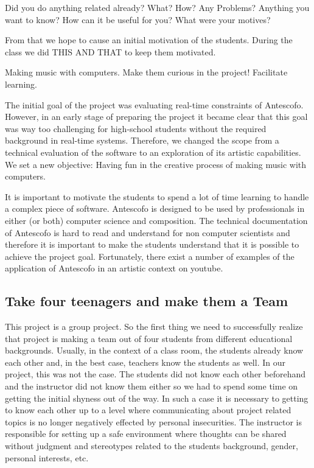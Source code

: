 \documentclass[onecolumn,nocopyrightspace,preprint]{sigplanconf}
\begin{document}
Did you do anything related already? What? How? Any Problems? Anything you want to know?
How can it be useful for you?
What were your motives?

From that we hope to cause an initial motivation of the students. During the class we did THIS AND THAT
to keep them motivated.


Making music with computers.
Make them curious in the project!
Facilitate learning.


The initial goal of the project was evaluating real-time constraints of
Antescofo. However, in an early stage of preparing the project it became clear
that this goal was way too challenging for high-school students without the
required background in real-time systems. Therefore, we changed the scope from
a technical evaluation of the software to an exploration of its artistic
capabilities. We set a new objective: Having fun in the creative process of
making music with computers.


It is important to motivate the students to spend a lot of time learning to
handle a complex piece of software. Antescofo is designed to be used by
professionals in either (or both) computer science and composition. The
technical documentation of Antescofo is hard to read and understand for non
computer scientists and therefore it is important to make the students
understand that it is possible to achieve the project goal. Fortunately, there
exist a number of examples of the application of Antescofo in an artistic
context on youtube.

\subsection{Take four teenagers and make them a Team}

This project is a group project. So the first thing we need to successfully
realize that project is making a team out of four students from different
educational backgrounds. Usually, in the context of a class room, the students
already know each other and, in the best case, teachers know the students as
well. In our project, this was not the case. The students did not know each
other beforehand and the instructor did not know them either so we had to
spend some time on getting the initial shyness out of the way.
In such a case it is necessary to getting to know each other up to a level
where communicating about project related topics is no longer negatively
effected by personal insecurities. The instructor is responsible for setting
up a safe environment where thoughts can be shared without judgment and
stereotypes related to the students background, gender, personal interests, etc.
\end{document}
